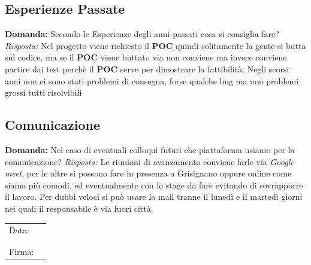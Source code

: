 \documentclass{article}
\begin{document}
\subsection{Esperienze Passate}
\textbf{Domanda:} Secondo le Esperienze degli anni passati cosa si consiglia fare?
\newline
\textit{Risposta:} Nel progetto viene richiesto il \textbf{POC} quindi solitamente la gente si butta sul codice, ma se il \textbf{POC} viene buttato via non conviene ma invece conviene partire dai test perchè il \textbf{POC} serve per dimostrare la fattibilità.
Negli scorsi anni non ci sono stati problemi di consegna, forse qualche bug ma non problemi grossi tutti risolvibili
\subsection{Comunicazione}
\textbf{Domanda:} Nel caso di eventuali colloqui futuri che piattaforma usiamo per la comunicazione?
\newline
\textit{Risposta:} Le riunioni di avanzamento conviene farle via \textit{Google meet}, per le altre si possono fare in presenza a Grisignano oppure online come siamo più comodi, ed eventualmente con lo stage da fare evitando di sovrapporre il lavoro. Per dubbi veloci si può usare la mail tranne il lunedì e il martedì giorni nei quali il responsabile è via fuori città.

\begin{table}[b]
	\begin{tabular}{@{}p{.5in}p{4in}@{}}
		Data:  & \hrulefill \\
			   &     		\\
			   &     		\\
		Firma: & \hrulefill \\
	\end{tabular}
	\end{table}
\end{document}
